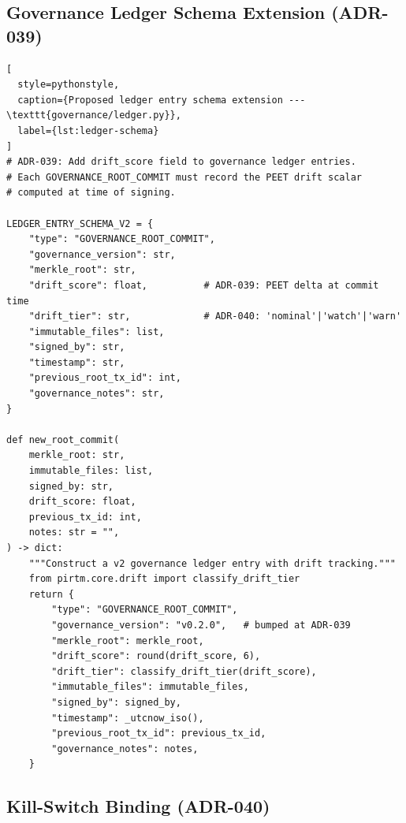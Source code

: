 \documentclass[11pt,letterpaper]{article}
\theoremstyle{definition}
\theoremstyle{remark}
\begin{document}
\subsection{Governance Ledger Schema Extension (ADR-039)}

\begin{lstlisting}[
  style=pythonstyle,
  caption={Proposed ledger entry schema extension --- \texttt{governance/ledger.py}},
  label={lst:ledger-schema}
]
# ADR-039: Add drift_score field to governance ledger entries.
# Each GOVERNANCE_ROOT_COMMIT must record the PEET drift scalar
# computed at time of signing.

LEDGER_ENTRY_SCHEMA_V2 = {
    "type": "GOVERNANCE_ROOT_COMMIT",
    "governance_version": str,
    "merkle_root": str,
    "drift_score": float,          # ADR-039: PEET delta at commit time
    "drift_tier": str,             # ADR-040: 'nominal'|'watch'|'warn'
    "immutable_files": list,
    "signed_by": str,
    "timestamp": str,
    "previous_root_tx_id": int,
    "governance_notes": str,
}

def new_root_commit(
    merkle_root: str,
    immutable_files: list,
    signed_by: str,
    drift_score: float,
    previous_tx_id: int,
    notes: str = "",
) -> dict:
    """Construct a v2 governance ledger entry with drift tracking."""
    from pirtm.core.drift import classify_drift_tier
    return {
        "type": "GOVERNANCE_ROOT_COMMIT",
        "governance_version": "v0.2.0",   # bumped at ADR-039
        "merkle_root": merkle_root,
        "drift_score": round(drift_score, 6),
        "drift_tier": classify_drift_tier(drift_score),
        "immutable_files": immutable_files,
        "signed_by": signed_by,
        "timestamp": _utcnow_iso(),
        "previous_root_tx_id": previous_tx_id,
        "governance_notes": notes,
    }
\end{lstlisting}

\subsection{Kill-Switch Binding (ADR-040)}
\end{document}
